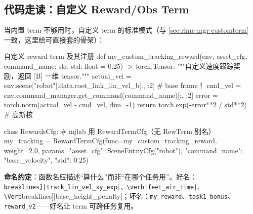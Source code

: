 
\subsection{代码走读：自定义 Reward/Obs Term}
\label{sec:rlmc-diy-customterm}

当内置 term 不够用时，自定义 term 的标准模式（与 \cref{sec:rlmc-mgr-customterm} 一致，这里给可直接套的骨架）：

\begin{codebox}[Python]{自定义 reward term 及其注册}
def my_custom_tracking_reward(env, asset_cfg, command_name: str,
                              std: float = 0.25) -> torch.Tensor:
    """自定义速度跟踪奖励，返回 [B] 一维 tensor."""
    actual_vel = env.scene["robot"].data.root_link_lin_vel_b[:, :2]  # base frame！
    cmd_vel    = env.command_manager.get_command(command_name)[:, :2]
    error      = torch.norm(actual_vel - cmd_vel, dim=-1)
    return torch.exp(-error**2 / std**2)                            # 高斯核

class RewardsCfg:                          # mjlab 用 RewardTermCfg（无 RewTerm 别名）
    my_tracking = RewardTermCfg(func=my_custom_tracking_reward, weight=2.0,
        params={"asset_cfg": SceneEntityCfg("robot"),
                "command_name": "base_velocity", "std": 0.25})
\end{codebox}

\textbf{命名约定}：函数名应描述“算什么”而非“在哪个任务用”。好名：\Verb[breaklines]|track_lin_vel_xy_exp|、\verb|feet_air_time|、\Verb[breaklines]|base_height_penalty|；坏名：\verb|my_reward|、\verb|task1_bonus|、\verb|reward_v2|——好名让 term 可跨任务复用。

